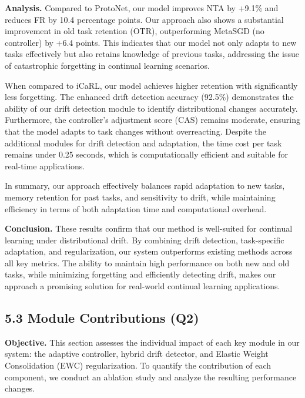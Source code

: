 \documentclass[conference]{IEEEtran}
\begin{document}
\textbf{Analysis.}  
Compared to ProtoNet, our model improves NTA by +9.1\% and reduces FR by 10.4 percentage points. Our approach also shows a substantial improvement in old task retention (OTR), outperforming MetaSGD (no controller) by +6.4 points. This indicates that our model not only adapts to new tasks effectively but also retains knowledge of previous tasks, addressing the issue of catastrophic forgetting in continual learning scenarios.

When compared to iCaRL, our model achieves higher retention with significantly less forgetting. The enhanced drift detection accuracy (92.5\%) demonstrates the ability of our drift detection module to identify distributional changes accurately. Furthermore, the controller’s adjustment score (CAS) remains moderate, ensuring that the model adapts to task changes without overreacting. Despite the additional modules for drift detection and adaptation, the time cost per task remains under 0.25 seconds, which is computationally efficient and suitable for real-time applications.

In summary, our approach effectively balances rapid adaptation to new tasks, memory retention for past tasks, and sensitivity to drift, while maintaining efficiency in terms of both adaptation time and computational overhead.

\textbf{Conclusion.}  
These results confirm that our method is well-suited for continual learning under distributional drift. By combining drift detection, task-specific adaptation, and regularization, our system outperforms existing methods across all key metrics. The ability to maintain high performance on both new and old tasks, while minimizing forgetting and efficiently detecting drift, makes our approach a promising solution for real-world continual learning applications.


\subsection{5.3 Module Contributions (Q2)}

\textbf{Objective.}  
This section assesses the individual impact of each key module in our system: the adaptive controller, hybrid drift detector, and Elastic Weight Consolidation (EWC) regularization. To quantify the contribution of each component, we conduct an ablation study and analyze the resulting performance changes.
\end{document}
